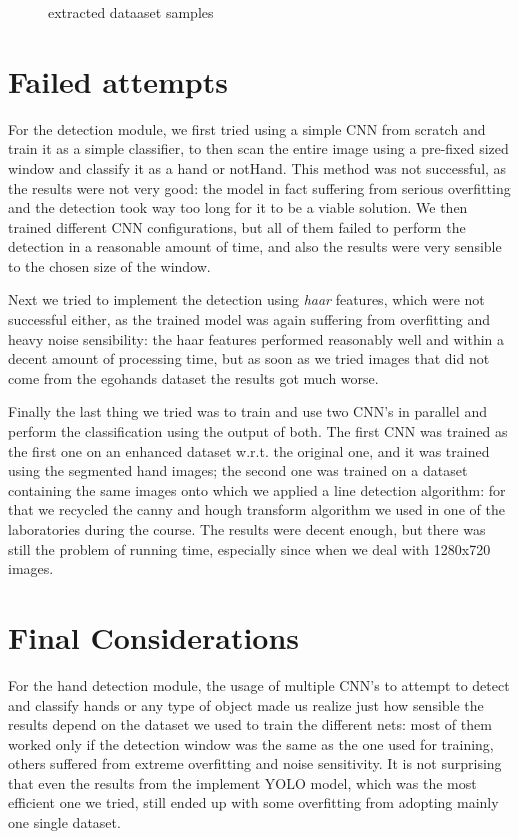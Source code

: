 \begin{figure}
\begin{subfigure}[b]{0.3\textwidth}
    \end{subfigure}
       \caption{extracted dataaset samples}
       
\end{figure}


\newpage


\section{Failed attempts}

For the detection module, we first tried using a simple CNN from scratch and train it as a simple classifier, to then scan the entire image
using a pre-fixed sized window and classify it as a hand or notHand. This method was not successful, as the results were not very good: the model
in fact suffering from serious overfitting and the detection took way too long for it to be a viable solution.
We then trained different CNN configurations, but all of them failed to perform the detection in a reasonable amount of time, and also 
the results were very sensible to the chosen size of the window. 

Next we tried to implement the detection using \textit{haar} features, which were not successful either, as the trained model
was again suffering from overfitting and heavy noise sensibility: the haar features performed reasonably well and within a decent amount
of processing time, but as soon as we tried images that did not come from the egohands dataset the results got much worse.

Finally the last thing we tried was to train and use two CNN's in parallel and perform the classification using the output of both.
The first CNN was trained as the first one on an enhanced dataset w.r.t. the original one, and it was trained using the segmented hand images;
the second one was trained on a dataset containing the same images onto which we applied a line detection algorithm: for that we recycled the canny and 
hough transform algorithm we used in one of the laboratories during the course. The results were decent enough, but there was still the problem of running time,
especially since when we deal with 1280x720 images. 

\section{Final Considerations}
For the hand detection module, the usage of multiple CNN's to attempt to detect and classify hands or any type of object made us realize just 
how sensible the results depend on the dataset we used to train the different nets: most of them worked only if the detection window was the same 
as the one used for training, others suffered from extreme overfitting and noise sensitivity. It is not surprising that even 
the results from the implement YOLO model, which was the most efficient one we tried, still ended up with some overfitting from adopting
mainly one single dataset. 

